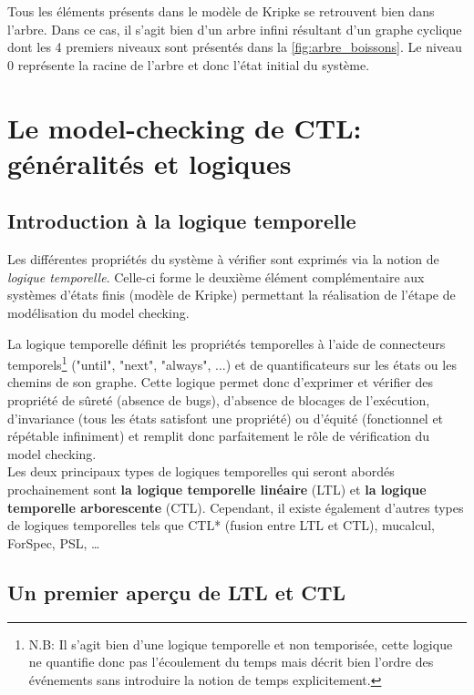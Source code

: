 \documentclass[runningheads,a4paper,10pt]{llncs}
\begin{document}
Tous les éléments présents dans le modèle de Kripke se retrouvent bien dans l'arbre. Dans ce cas, il s'agit bien d'un arbre infini résultant d'un graphe cyclique dont les 4 premiers niveaux sont présentés dans la \autoref{fig:arbre_boissons}. Le niveau 0 représente la racine de l'arbre et donc l'état initial du système. 

 
\section{Le model-checking de CTL: généralités et logiques}

\subsection{Introduction à la logique temporelle} \label{sec:log-temp}
Les différentes propriétés du système à vérifier sont exprimés via la notion de \textit{logique temporelle}. Celle-ci forme le deuxième élément complémentaire aux systèmes d'états finis (modèle de Kripke) permettant la réalisation de l'étape de modélisation du model checking. 

La logique temporelle définit les propriétés temporelles à l’aide de connecteurs temporels\footnote{N.B: Il s'agit bien d'une logique temporelle et non temporisée, cette logique ne quantifie donc pas l'écoulement du temps mais décrit bien l'ordre des événements sans introduire la notion de temps explicitement.} ("until", "next", "always", ...) et de quantificateurs sur les états ou les chemins de son graphe. Cette logique permet donc d'exprimer et vérifier des propriété de sûreté (absence de bugs), d’absence de blocages de l’exécution, d'invariance (tous les états satisfont une propriété) ou d'équité (fonctionnel et répétable infiniment) et remplit donc parfaitement le rôle de vérification du model checking. \\

Les deux principaux types de logiques temporelles qui seront abordés prochainement sont \textbf{la logique temporelle linéaire} (LTL) et \textbf{la logique temporelle arborescente} (CTL). Cependant, il existe également d'autres types de logiques temporelles tels que CTL* (fusion entre LTL et CTL), mucalcul, ForSpec, PSL, \dots 

\subsection{Un premier aperçu de LTL et CTL}
\end{document}
